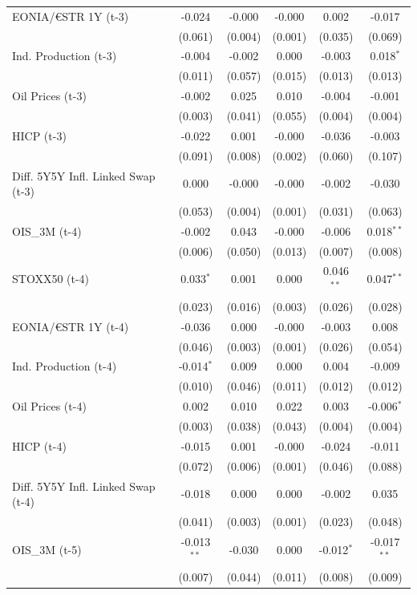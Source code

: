 \begin{longtable}[t]{lccccc}
EONIA/€STR 1Y (t-3) & -0.024 & -0.000 & -0.000 & 0.002 & -0.017\\
 & (0.061) & (0.004) & (0.001) & (0.035) & (0.069)\\
Ind. Production (t-3) & -0.004 & -0.002 & 0.000 & -0.003 & 0.018$^{*}$\\
 & (0.011) & (0.057) & (0.015) & (0.013) & (0.013)\\
Oil Prices (t-3) & -0.002 & 0.025 & 0.010 & -0.004 & -0.001\\
 & (0.003) & (0.041) & (0.055) & (0.004) & (0.004)\\
HICP (t-3) & -0.022 & 0.001 & -0.000 & -0.036 & -0.003\\
 & (0.091) & (0.008) & (0.002) & (0.060) & (0.107)\\
Diff. 5Y5Y Infl. Linked Swap (t-3) & 0.000 & -0.000 & -0.000 & -0.002 & -0.030\\
 & (0.053) & (0.004) & (0.001) & (0.031) & (0.063)\\
OIS\_3M (t-4) & -0.002 & 0.043 & -0.000 & -0.006 & 0.018$^{**}$\\
 & (0.006) & (0.050) & (0.013) & (0.007) & (0.008)\\
STOXX50 (t-4) & 0.033$^{*}$ & 0.001 & 0.000 & 0.046$^{**}$ & 0.047$^{**}$\\
 & (0.023) & (0.016) & (0.003) & (0.026) & (0.028)\\
EONIA/€STR 1Y (t-4) & -0.036 & 0.000 & -0.000 & -0.003 & 0.008\\
 & (0.046) & (0.003) & (0.001) & (0.026) & (0.054)\\
Ind. Production (t-4) & -0.014$^{*}$ & 0.009 & 0.000 & 0.004 & -0.009\\
 & (0.010) & (0.046) & (0.011) & (0.012) & (0.012)\\
Oil Prices (t-4) & 0.002 & 0.010 & 0.022 & 0.003 & -0.006$^{*}$\\
 & (0.003) & (0.038) & (0.043) & (0.004) & (0.004)\\
HICP (t-4) & -0.015 & 0.001 & -0.000 & -0.024 & -0.011\\
 & (0.072) & (0.006) & (0.001) & (0.046) & (0.088)\\
Diff. 5Y5Y Infl. Linked Swap (t-4) & -0.018 & 0.000 & 0.000 & -0.002 & 0.035\\
 & (0.041) & (0.003) & (0.001) & (0.023) & (0.048)\\
OIS\_3M (t-5) & -0.013$^{**}$ & -0.030 & 0.000 & -0.012$^{*}$ & -0.017$^{**}$\\
 & (0.007) & (0.044) & (0.011) & (0.008) & (0.009)\\

\end{longtable}
